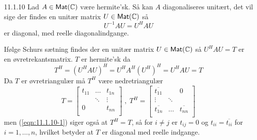 %
%

\begin{saetning}{11.1.10}
	Lad $A \in \textsf{Mat}(\mathbb{C})$ være hermite'sk. Så kan $A$ diagonaliseres
	unitært, det vil sige der findes en unitær matrix $U \in \textsf{Mat}(\mathbb{C})$
	så
	\[
		U^{-1}AU=U^HAU
	\]
	er diagonal, med reelle diagonalindgange.
\end{saetning}

\begin{bevis}
	Ifølge Schurs sætning findes der en unitær matrix $U \in \textsf{Mat}(\mathbb{C})$
	så $U^HAU = T$ er en øvretrekantsmatrix. $T$ er hermite'sk da
	\begin{equation}\label{eqn:11.1.10-1}
		T^H = (U^HAU)^H = U^HA^H(U^H)^H = U^HAU = T
	\end{equation}
	Da $T$ er øvretriangulær må $T^H$ være nedretriangulær
	\[
		T = \begin{bmatrix}
			t_{11} & \dots 	& t_{1n} \\
				   & \ddots & \vdots \\
			   0   & 		& t_{nn} \\
		\end{bmatrix} \; , \; T^H = \begin{bmatrix}
			\overline{t_{11}} & 	   &    0 \\
				\vdots		  & \ddots &  \\
			\overline{t_{1n}} & \dots  & \overline{t_{nn}} \\
		\end{bmatrix}
	\]
	men (\ref{eqn:11.1.10-1}) siger også at $T^H = T$, så for $i \not= j$ er
	$t_{ij} = 0$ og $t_{ii} = \overline{t_{ii}}$ for $i = 1,\dotsc,n$, hvilket
	betyder at $T$ er diagonal med reelle indgange.
\end{bevis}
